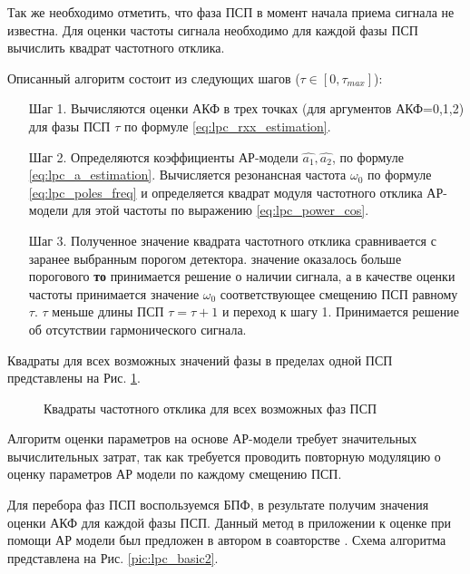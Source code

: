 Так же необходимо отметить, что фаза ПСП в момент начала приема сигнала не известна.
Для оценки частоты сигнала необходимо для каждой фазы ПСП вычислить квадрат частотного
отклика.

Описанный алгоритм состоит из следующих шагов (${\tau \in [0, \tau_{max}]}$):
\begin{itemize}[align=left,style=nextline,leftmargin=*,labelsep=\parindent,font=\normalfont]
\item[Шаг 1.] Вычисляются оценки АКФ в трех точках (для аргументов АКФ=0,1,2)
	для фазы ПСП ${\tau}$ по формуле \ref{eq:lpc_rxx_estimation}. 
\item[Шаг 2.] Определяются коэффициенты АР-модели ${\hat{a_1}, \hat{a_2}}$, 
	по формуле \ref{eq:lpc_a_estimation}. 
	Вычисляется резонансная частота ${\omega_0}$ по формуле \ref{eq:lpc_poles_freq}
	и определяется квадрат модуля частотного отклика АР-модели для этой частоты по выражению \ref{eq:lpc_power_cos}. 
\item[Шаг 3.] Полученное значение квадрата частотного отклика сравнивается с заранее выбранным порогом детектора. 
	  значение оказалось больше порогового {\bf{то}} 
		принимается решение о наличии сигнала, а в качестве оценки
		частоты принимается значение ${\omega_0}$ соответствующее смещению ПСП равному ${\tau}$. 
	 ${\tau}$ меньше длины ПСП ${\tau = \tau + 1}$ и переход к шагу 1.
		Принимается решение об отсутствии гармонического сигнала.
\end{itemize}

Квадраты для всех возможных значений фазы в пределах одной ПСП представлены на Рис. \ref{pic:lpc_1sat_energy}.
\begin{figure}[h]
	\center{}
	\caption{Квадраты частотного отклика для всех возможных фаз ПСП}
	\label{pic:lpc_1sat_energy}
\end{figure}


Алгоритм оценки параметров на основе АР-модели требует значительных вычислительных затрат, так как требуется проводить
повторную модуляцию о оценку параметров АР модели по каждому смещению ПСП.

Для перебора фаз ПСП воспользуемся БПФ, в результате получим значения оценки АКФ для каждой фазы ПСП. Данный метод в приложении к оценке при помощи АР модели
был предложен в автором в соавторстве \cite{my_lpc_for_1, my_lpc_for_1_controllers}. Схема алгоритма представлена на Рис. \ref{pic:lpc_basic2}. 

